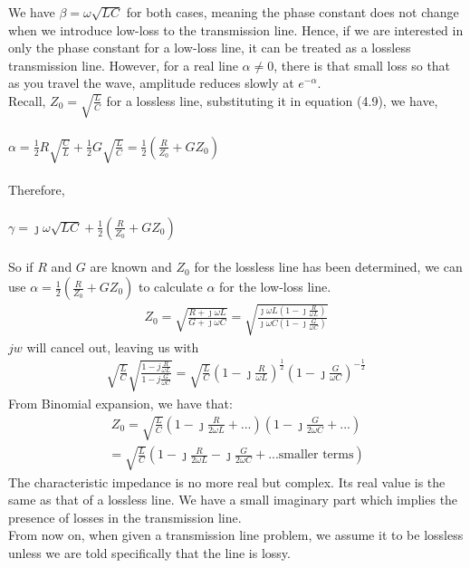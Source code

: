 We have $\beta = \omega\sqrt{LC}$ for both cases, meaning the phase constant does not change when we introduce low-loss to the transmission line. Hence, if we are interested in only the phase constant for a low-loss line, it can be treated as a lossless transmission line. However, for a real line $\alpha \neq 0$, there is that small loss so that as you travel the wave, amplitude reduces slowly at $e^{-\alpha}$.\\ Recall, $Z_0 = \sqrt{\frac{L}{C}}$ for a lossless line, substituting it in equation (4.9), we have,\\\\
$\alpha = \frac{1}{2}R\sqrt{\frac{C}{L}} + \frac{1}{2}G\sqrt{\frac{L}{C}} = \frac{1}{2}(\frac{R}{Z_0} + GZ_0)$\\\\
Therefore,\\\\
$\gamma = \jmath\omega\sqrt{LC} + \frac{1}{2}(\frac{R}{Z_0} + GZ_0)$\\\\
So if $R$ and $G$ are known and $Z_0$ for the lossless line has been determined, we can use $\alpha = \frac{1}{2}(\frac{R}{Z_0} + GZ_0)$ to calculate $\alpha$ for the low-loss line.
\begin{align*}
Z_0 = \sqrt{\frac{R + \jmath\omega L}{G + \jmath\omega C}} = \sqrt{\frac{\jmath\omega L(1 - \jmath\frac{R}{\omega L})}{\jmath\omega C(1 - \jmath\frac{G}{\omega C})}}
\end{align*}
$jw$ will cancel out, leaving us with
\begin{align*}
\sqrt{\frac{L}{C}}\sqrt{\frac{1 - j\frac{R}{\omega L}}{1 - j\frac{G}{\omega C}}} =\sqrt{\frac{L}{C}}\left(1 - \jmath\frac{R}{\omega L}\right)^{\frac{1}{2}}\left(1 - \jmath\frac{G}{\omega C}\right)^{-\frac{1}{2}} 
\end{align*}
From Binomial expansion, we have that:
\begin{align*}
Z_0 = \sqrt{\frac{L}{C}}\left(1 - \jmath\frac{R}{2\omega L} + ...\right)\left(1 - \jmath\frac{G}{2\omega C} + ...\right)
\end{align*}
\begin{align*}
= \sqrt{\frac{L}{C}}\left(1 - \jmath\frac{R}{2\omega L} - \jmath\frac{G}{2\omega C} + \text{...smaller terms}\right)
\end{align*}
The characteristic impedance is no more real but complex. Its real value is the same as that of a lossless line. We have a small imaginary part which implies the presence of losses in the transmission line.\\

From now on, when given a transmission line problem, we assume it to be lossless unless we are told specifically that the line is lossy.